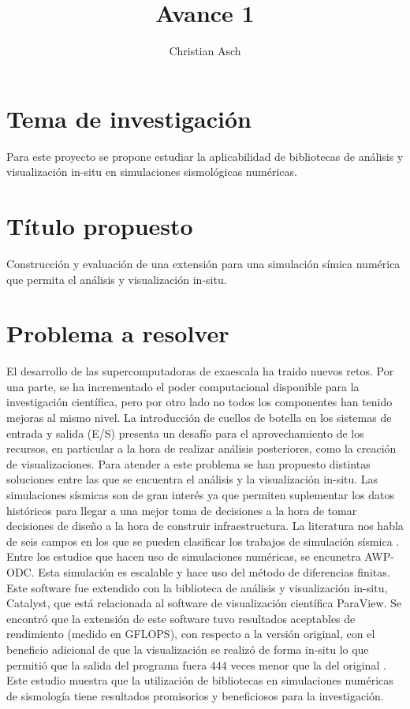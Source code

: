 \documentclass{article}
\begin{document}
\title{Avance 1}
\author{Christian Asch}
\date{}
\maketitle

\section{Tema de investigación}
 Para este proyecto se propone estudiar la aplicabilidad de bibliotecas de análisis y visualización in-situ en simulaciones sismológicas numéricas.
\section{Título propuesto}
Construcción y evaluación de una extensión para una simulación símica numérica que permita el análisis y visualización in-situ.
\section{Problema a resolver}
El desarrollo de las supercomputadoras de exaescala ha traido nuevos retos. Por una parte, se ha incrementado el poder computacional disponible para la investigación científica, pero por otro lado no todos los componentes han tenido mejoras al mismo nivel. La introducción de cuellos de botella en los sistemas de entrada y salida (E/S) presenta un desafío para el aprovechamiento de los recursos, en particular a la hora de realizar análisis posteriores, como la creación de visualizaciones. Para atender a este problema se han propuesto distintas soluciones entre las que se encuentra el análisis y la visualización in-situ. \cite{akira_kageyama_approach_2014}
Las simulaciones sísmicas son de gran interés ya que permiten suplementar los datos históricos para llegar a una mejor toma de decisiones a la hora de tomar decisiones de diseño a la hora de construir infraestructura. La literatura nos habla de seis campos en los que se pueden clasificar los trabajos de simulación sísmica \cite{poursartip_large-scale_2020}. Entre los estudios que hacen uso de simulaciones numéricas, se encunetra AWP-ODC. Esta simulación es escalable y hace uso del método de diferencias finitas. Este software fue extendido con la biblioteca de análisis y visualización in-situ, Catalyst, que está relacionada al software de visualización científica ParaView. Se encontró que la extensión de este software tuvo resultados aceptables de rendimiento (medido en GFLOPS), con respecto a la versión original, con el beneficio adicional de que la visualización se realizó de forma in-situ lo que permitió que la salida del programa fuera 444 veces menor que la del original \cite{mu_-situ_2019}. Este estudio muestra que la utilización de bibliotecas en simulaciones numéricas de sismología tiene resultados promisorios y beneficiosos para la investigación.
\end{document}
